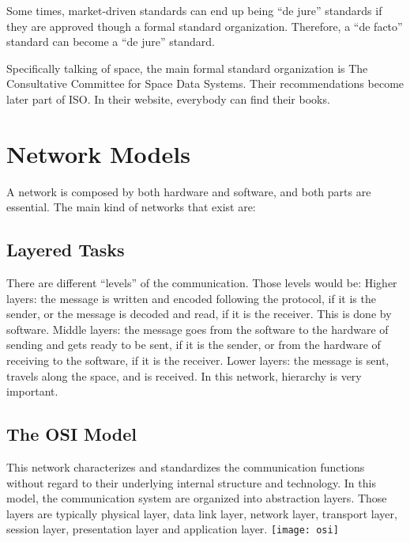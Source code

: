 \documentclass[12pt,a4paper]{report}
\begin{document}
Some times, market-driven standards can end up being “de jure” standards if they are approved though a formal standard organization. Therefore, a “de facto” standard can become a “de jure” standard.

Specifically talking of space, the main formal standard organization is The Consultative Committee for Space Data Systems. Their recommendations become later part of ISO. In their website, everybody can find their books.



\chapter{Network Models}
A network is composed by both hardware and software, and both parts are essential. The main kind of networks that exist are:
\section{Layered Tasks}
There are different “levels” of the communication. Those levels would be: 
Higher layers: the message is written and encoded following the protocol, if it is the sender, or the message is decoded and read, if it is the receiver. This is done by software.
Middle layers: the message goes from the software to the hardware of sending and gets ready to be sent, if it is the sender, or from the hardware of receiving to the software, if it is the receiver. 
Lower layers: the message is sent, travels along the space, and is received. 
In this network, hierarchy is very important.


\section{The OSI Model}
This network characterizes and standardizes the communication functions without regard to their underlying internal structure and technology. In this model, the communication system are organized into abstraction layers. Those layers are typically physical layer, data link layer, network layer, transport layer, session layer, presentation layer and application layer. 
\texttt{[image: osi]} \newline
\end{document}
